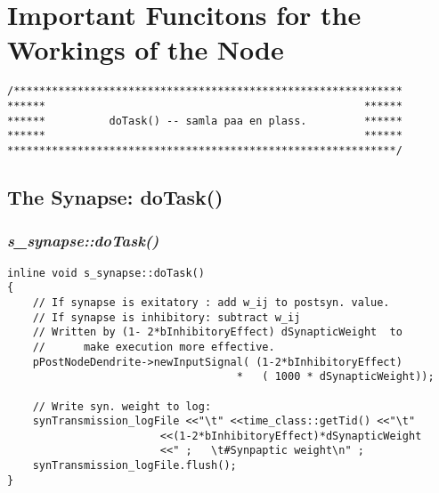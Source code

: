 




\chapter{Important Funcitons for the Workings of the Node} %
\label{appendixDifferentDoTaskFunctions} 

\begin{lstlisting}
/*************************************************************
****** 													******
******  		doTask() -- samla paa en plass. 		******
****** 													******
*************************************************************/
\end{lstlisting}


\section{The Synapse: doTask()}
\label{appendixDoTaskForSynapse}
\subsection{\emph{s\_synapse::doTask()}}
\begin{lstlisting}
inline void s_synapse::doTask()
{
	// If synapse is exitatory : add w_ij to postsyn. value.
	// If synapse is inhibitory: subtract w_ij
	// Written by (1- 2*bInhibitoryEffect) dSynapticWeight  to 
	// 		make execution more effective.
 	pPostNodeDendrite->newInputSignal( (1-2*bInhibitoryEffect) 
									* 	( 1000 * dSynapticWeight)); 

	// Write syn. weight to log:
	synTransmission_logFile <<"\t" <<time_class::getTid() <<"\t" 
						<<(1-2*bInhibitoryEffect)*dSynapticWeight
						<<" ;   \t#Synpaptic weight\n" ;
	synTransmission_logFile.flush();
}
\end{lstlisting}




